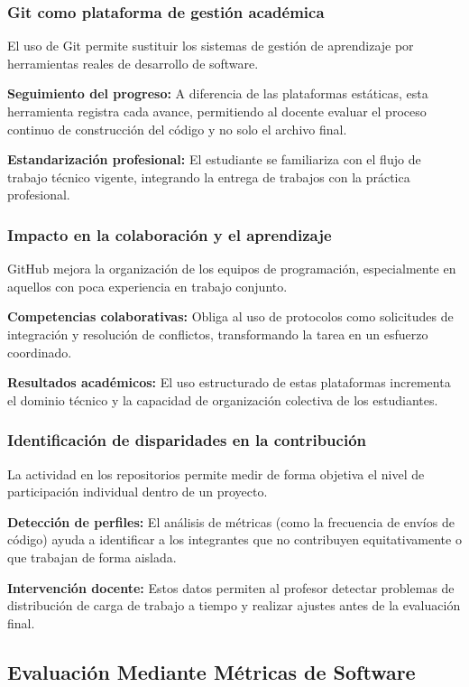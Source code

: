 \documentclass[12pt,a4paper]{article}
\begin{document}
\subsubsection{Git como plataforma de gestión académica}
El uso de Git permite sustituir los sistemas de gestión de aprendizaje por herramientas reales de desarrollo de software.\cite{wolf2024}

\textbf{Seguimiento del progreso:} A diferencia de las plataformas estáticas, esta herramienta registra cada avance, permitiendo al docente evaluar el proceso continuo de construcción del código y no solo el archivo final.

\textbf{Estandarización profesional:} El estudiante se familiariza con el flujo de trabajo técnico vigente, integrando la entrega de trabajos con la práctica profesional.

\subsubsection{Impacto en la colaboración y el aprendizaje}
GitHub mejora la organización de los equipos de programación, especialmente en aquellos con poca experiencia en trabajo conjunto.\cite{patani2024}

\textbf{Competencias colaborativas:} Obliga al uso de protocolos como solicitudes de integración y resolución de conflictos, transformando la tarea en un esfuerzo coordinado.

\textbf{Resultados académicos:} El uso estructurado de estas plataformas incrementa el dominio técnico y la capacidad de organización colectiva de los estudiantes.

\subsubsection{Identificación de disparidades en la contribución}
La actividad en los repositorios permite medir de forma objetiva el nivel de participación individual dentro de un proyecto.\cite{nguyen2023}

\textbf{Detección de perfiles:} El análisis de métricas (como la frecuencia de envíos de código) ayuda a identificar a los integrantes que no contribuyen equitativamente o que trabajan de forma aislada.

\textbf{Intervención docente:} Estos datos permiten al profesor detectar problemas de distribución de carga de trabajo a tiempo y realizar ajustes antes de la evaluación final.

\subsection{Evaluación Mediante Métricas de Software}
\end{document}
